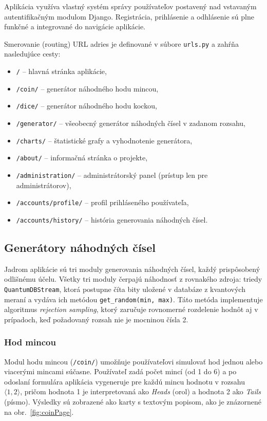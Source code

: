 Aplikácia využíva vlastný systém správy používateľov postavený nad vstavaným autentifikačným modulom Django.
Registrácia, prihlásenie a odhlásenie sú plne funkčné a integrované do navigácie aplikácie.

Smerovanie (routing) URL adries je definované v súbore \texttt{urls.py} a zahŕňa nasledujúce cesty:

\begin{itemize}
  \item \texttt{/} -- hlavná stránka aplikácie,
  \item \texttt{/coin/} -- generátor náhodného hodu mincou,
  \item \texttt{/dice/} -- generátor náhodného hodu kockou,
  \item \texttt{/generator/} -- všeobecný generátor náhodných čísel v zadanom rozsahu,
  \item \texttt{/charts/} -- štatistické grafy a vyhodnotenie generátora,
  \item \texttt{/about/} -- informačná stránka o projekte,
  \item \texttt{/administration/} -- administrátorský panel (prístup len pre administrátorov),
  \item \texttt{/accounts/profile/} -- profil prihláseného používateľa,
  \item \texttt{/accounts/history/} -- história generovania náhodných čísel.
\end{itemize}

\subsection{Generátory náhodných čísel}

Jadrom aplikácie sú tri moduly generovania náhodných čísel, každý prispôsobený odlišnému účelu.
Všetky tri moduly čerpajú náhodnosť z rovnakého zdroja: triedy \texttt{QuantumDBStream}, ktorá postupne číta bity uložené v databáze z kvantových meraní a vydáva ich metódou \texttt{get\_random(min, max)}.
Táto metóda implementuje algoritmus \textit{rejection sampling}, ktorý zaručuje rovnomerné rozdelenie hodnôt aj v prípadoch, keď požadovaný rozsah nie je mocninou čísla 2.

\subsubsection{Hod mincou}

Modul hodu mincou (\texttt{/coin/}) umožňuje používateľovi simulovať hod jednou alebo viacerými mincami súčasne.
Používateľ zadá počet mincí (od 1 do 6) a po odoslaní formulára aplikácia vygeneruje pre každú mincu hodnotu v rozsahu $\langle 1, 2 \rangle$, pričom hodnota 1 je interpretovaná ako \textit{Heads} (orol) a hodnota 2 ako \textit{Tails} (písmo).
Výsledky sú zobrazené ako karty s textovým popisom, ako je znázornené na obr.~\ref{fig:coinPage}.

